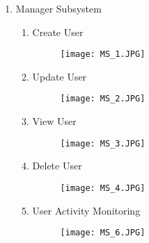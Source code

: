 \documentclass{article}
\begin{document}
\begin{enumerate}
\begin{enumerate}
            	\end{enumerate}
            
            \item{Manager Subsystem}
        		\begin{enumerate}
                    \item{Create User }
                    \begin{figure}[H]
                    	\centering
                        \texttt{[image: MS\_1.JPG]}	
                        \newline
                        \newline
                    \end{figure}
                    
                    \item{Update User }
                    \begin{figure}[H]
                    	\centering
                        \texttt{[image: MS\_2.JPG]}
                        \newline
                        \newline
                    \end{figure}
                    
                    \item{View User }
                    \begin{figure}[H]
                    	\centering
                        \texttt{[image: MS\_3.JPG]}
                        \newline
                        \newline
                    \end{figure}
                    
                    \item{Delete User}
                    \begin{figure}[H]
                    	\centering
                        \texttt{[image: MS\_4.JPG]}
						\newline
                        \newline
                    \end{figure}
                    
                    \item{User Activity Monitoring}
                    \begin{figure}[H]
                    	\centering
                        \texttt{[image: MS\_6.JPG]}
                        \newline
                        \newline
                    \end{figure}
                    

\end{enumerate}
\end{enumerate}
\end{document}
